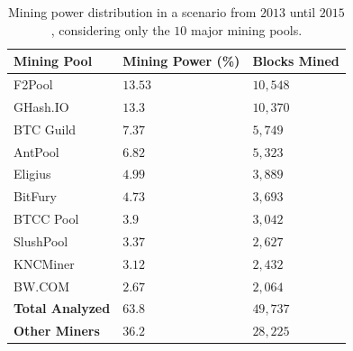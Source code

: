 \documentclass[USenglish]{uit-thesis}
\begin{document}
\begin{table}
	\centering
	\caption{Mining power distribution in a scenario from $2013$ until $2015$,
		considering only the $10$ major mining pools.}
	\label{tab:miner_share_2015}
	\begin{tabular}{|p{3.3cm}|p{3.3cm}|p{3.3cm}|} \hline
		\textbf{Mining Pool}&\textbf{Mining Power (\%)}& \textbf{Blocks Mined}\\
		\hline
		\rowcolor{F2Pool}
		F2Pool&$13.53$&$10,548$\\
		\hline
		GHash.IO&$13.3$&$10,370$\\
		\hline
		BTC Guild&$7.37$&$5,749$\\
		\hline
		\rowcolor{AntPool}
		AntPool&$6.82$&$5,323$\\
		\hline
		Eligius&$4.99$&$3,889$\\
		\hline
		\rowcolor{BitFury}
		BitFury&$4.73$&$3,693$\\
		\hline
		\rowcolor{BTCC Pool}
		BTCC Pool&$3.9$&$3,042$\\
		\hline
		\rowcolor{SlushPool}
		SlushPool&$3.37$&$2,627$\\
		\hline
		KNCMiner&$3.12$&$2,432$\\
		\hline
		\rowcolor{BW.COM}
		BW.COM&$2.67$&$2,064$\\
		\hline
		\rowcolor{TablesColor}
		\textbf{Total Analyzed}&$63.8$&$49,737$\\
		\hline
		\textbf{Other Miners}&$36.2$&$28,225$\\
		\hline
	\end{tabular}
\end{table}
\end{document}

